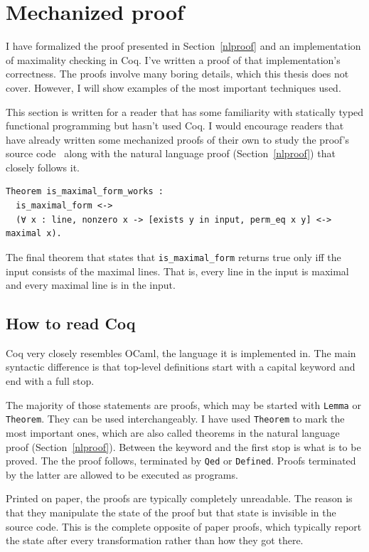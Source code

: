\documentclass[english, 12pt, a4paper, sci, a-1b, online]{aaltothesis}
\newcommand\icoq[1]{\texttt{#1}}
\begin{document}
\section{Mechanized proof}\label{mechproof}

I have formalized the proof presented in Section~\ref{nlproof} and an implementation of maximality checking in Coq. I've written a proof of that implementation's correctness. The proofs involve many boring details, which this thesis does not cover. However, I will show examples of the most important techniques used.

This section is written for a reader that has some familiarity with statically typed functional programming but hasn't used Coq. I would encourage readers that have already written some mechanized proofs of their own to study the proof's source code~\cite{source_code} along with the natural language proof (Section~\ref{nlproof}) that closely follows it.

\begin{listing}[h]
\begin{verbatim}
Theorem is_maximal_form_works :
  is_maximal_form <->
  (∀ x : line, nonzero x -> [exists y in input, perm_eq x y] <-> maximal x).
\end{verbatim}
\caption{The final theorem that states that \icoq{is_maximal_form} returns true only iff the input consists of the maximal lines. That is, every line in the input is maximal and every maximal line is in the input.}
\end{listing}

\subsection{How to read Coq}

Coq very closely resembles OCaml, the language it is implemented in. The main syntactic difference is that top-level definitions start with a capital keyword and end with a full stop.

The majority of those statements are proofs, which may be started with \icoq{Lemma} or \icoq{Theorem}. They can be used interchangeably. I have used \icoq{Theorem} to mark the most important ones, which are also called theorems in the natural language proof (Section~\ref{nlproof}). Between the keyword and the first stop is what is to be proved. The the proof follows, terminated by \icoq{Qed} or \icoq{Defined}. Proofs terminated by the latter are allowed to be executed as programs.

Printed on paper, the proofs are typically completely unreadable. The reason is that they manipulate the state of the proof but that state is invisible in the source code. This is the complete opposite of paper proofs, which typically report the state after every transformation rather than how they got there.
\end{document}
